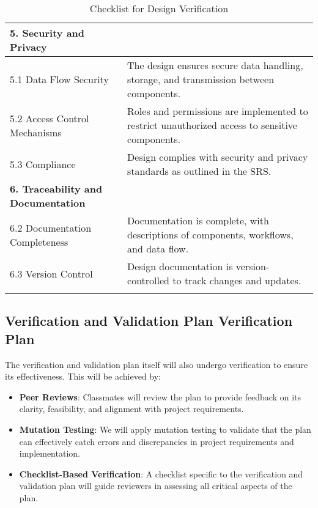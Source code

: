 \documentclass[12pt, titlepage]{article}
\begin{document}
\begin{center}
\begin{longtable}{|p{4cm}|p{11cm}|}
  \textbf{5. Security and Privacy} & \\
  \hline
  5.1 Data Flow Security & The design ensures secure data handling, storage, and transmission between components. \\
  \hline
  5.2 Access Control Mechanisms & Roles and permissions are implemented to restrict unauthorized access to sensitive components. \\
  \hline
  5.3 Compliance & Design complies with security and privacy standards as outlined in the SRS. \\
  \hline
  
  \textbf{6. Traceability and Documentation} & \\
  \hline
  6.2 Documentation Completeness & Documentation is complete, with descriptions of components, workflows, and data flow. \\
  \hline
  6.3 Version Control & Design documentation is version-controlled to track changes and updates. \\
  \hline
  \caption{Checklist for Design Verification}
  \end{longtable}
  \end{center}

\subsection{Verification and Validation Plan Verification Plan}

The verification and validation plan itself will also undergo verification to ensure its effectiveness. This will be achieved by:

\begin{itemize}
    \item \textbf{Peer Reviews}: Classmates will review the plan to provide feedback on its clarity, feasibility, and alignment with project requirements.
    \item \textbf{Mutation Testing}: We will apply mutation testing to validate that the plan can effectively catch errors and discrepancies in project requirements and implementation.
    \item \textbf{Checklist-Based Verification}: A checklist specific to the verification and validation plan will guide reviewers in assessing all critical aspects of the plan.
\end{itemize}
\end{document}
